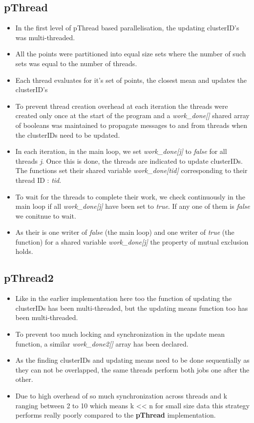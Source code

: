 \documentclass[letter, 11pt, margin=1in]{article}
\begin{document}
\subsection{pThread}

\begin{itemize}
    \item In the first level of pThread based parallelisation, the updating clusterID's was multi-threaded.
    \item All the points were partitioned into equal size sets where the number of such sets was equal to the number of threads.
    \item Each thread evaluates for it's set of points, the closest mean and updates the clusterID's
    \item To prevent thread creation overhead at each iteration the threads were created only once at the start of the program and a \textit{work\_done[]} shared array of booleans was maintained to propagate messages to and from threads when the clusterIDs need to be updated.
    \item In each iteration, in the main loop, we set \textit{work\_done[j]} to \textit{false} for all threads \textit{j}. Once this is done, the threads are indicated to update clusterIDs. The functions set their shared variable \textit{work\_done[tid]} corresponding to their thread ID : \textit{tid}.
    \item To wait for the threads to complete their work, we check continuously in the main loop if all \textit{work\_done[j]} have been set to \textit{true}. If any one of them is \textit{false} we conitnue to wait.
    \item As their is one writer of \textit{false} (the main loop) and one writer of \textit{true} (the function) for a shared variable \textit{work\_done[j]} the property of mutual exclusion holds.
\end{itemize}

\subsection{pThread2}

\begin{itemize}
    \item Like in the earlier implementation here too the function of updating the clusterIDs has been multi-threaded, but the updating means function too has been multi-threaded.
    \item To prevent too much locking and synchronization in the update mean function, a similar \textit{work\_done2[]} array has been declared.
    \item As the finding clusterIDs and updating means need to be done sequentially as they can not be overlapped, the same threads perform both jobs one after the other.
    \item Due to high overhead of so much synchronization across threads and k ranging between 2 to 10 which means k << n  for small size data this strategy performs really poorly compared to the \textbf{pThread} implementation.
\end{itemize}
\end{document}
